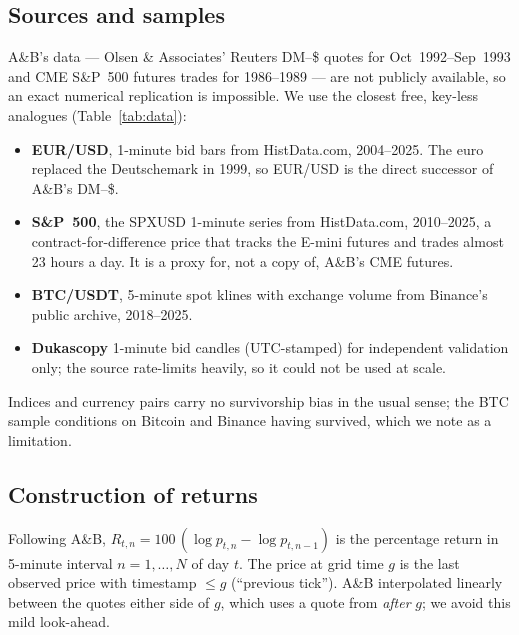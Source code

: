 \documentclass[11pt,a4paper]{article}
\newcommand{\tabin}[1]{\resizebox{\linewidth}{!}{}}
\begin{document}
\subsection{Sources and samples}
A\&B's data --- Olsen \& Associates' Reuters DM--\$ quotes for Oct~1992--Sep~1993 and CME S\&P~500 futures trades for 1986--1989 --- are not publicly available, so an exact numerical replication is impossible. We use the closest free, key-less analogues (Table~\ref{tab:data}):
\begin{itemize}
\item \textbf{EUR/USD}, 1-minute bid bars from HistData.com, 2004--2025. The euro replaced the Deutschemark in 1999, so EUR/USD is the direct successor of A\&B's DM--\$.
\item \textbf{S\&P~500}, the SPXUSD 1-minute series from HistData.com, 2010--2025, a contract-for-difference price that tracks the E-mini futures and trades almost 23 hours a day. It is a proxy for, not a copy of, A\&B's CME futures.
\item \textbf{BTC/USDT}, 5-minute spot klines with exchange volume from Binance's public archive, 2018--2025.
\item \textbf{Dukascopy} 1-minute bid candles (UTC-stamped) for independent validation only; the source rate-limits heavily, so it could not be used at scale.
\end{itemize}
Indices and currency pairs carry no survivorship bias in the usual sense; the BTC sample conditions on Bitcoin and Binance having survived, which we note as a limitation.

\begin{table}[t]
\centering\caption{Final samples after cleaning. ``Fresh'' is the share of 5-minute intervals containing at least one price update; ``Zero'' the share of returns exactly equal to zero.}
\label{tab:data}
\tabin{data_summary}
\end{table}

\subsection{Construction of returns}
Following A\&B, $R_{t,n}=100\,(\log p_{t,n}-\log p_{t,n-1})$ is the percentage return in 5-minute interval $n=1,\dots,N$ of day $t$. The price at grid time $g$ is the last observed price with timestamp $\le g$ (``previous tick''). A\&B interpolated linearly between the quotes either side of $g$, which uses a quote from \emph{after} $g$; we avoid this mild look-ahead.
\end{document}
